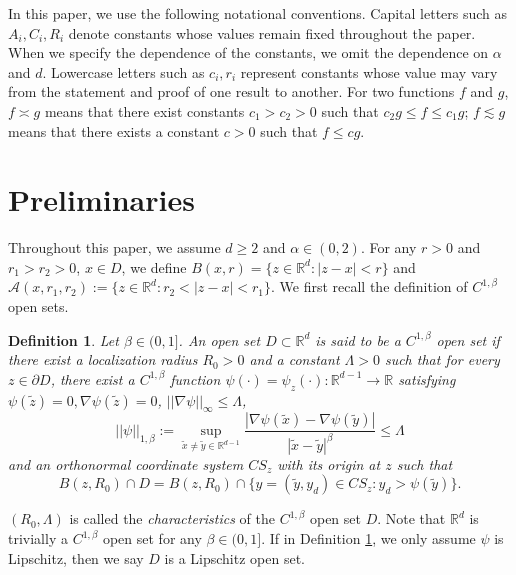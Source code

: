 \documentclass[12pt,a4paper]{amsart}
\numberwithin{equation}{section}
\theoremstyle{plain}
\newcommand{\mc}{\mathcal}
\newcommand{\mb}{\mathbb}
\newcommand{\wt}{\widetilde}
\newcommand{\R}{\mathbb{R}}
\newcommand{\1}{\mathbbm{1}}
\newtheorem{definition}[theorem]{Definition}
\begin{document}
In this paper, we use the following notational conventions. Capital letters such as $ A_i, C_i, R_i$ denote  constants whose values remain fixed throughout the paper. When we specify the dependence of the constants, we omit the dependence on $\alpha$ and $d$. 
Lowercase letters such as $ c_i, r_i$ represent constants whose value may 
vary from the statement and proof of one result to another. For two functions $f$ and $g$,  
        $f \asymp g $ means that there exist constants $c_1 > c_2 > 0$ such that
        $c_2 g \leq f \leq c_1 g$;
        $ f \lesssim g $ means that there exists a constant $ c > 0$ such that
        $f \leq c g$.
        
\section{Preliminaries}\label{sec:preliminary}

Throughout this paper, we assume $d\ge 2$ and $\alpha\in (0, 2)$. For any $r>0$ and $r_1>r_2>0$, $x\in D$, we define
$B(x,r)=\{z\in \R^d: |z-x|<r\}$ and  $\mc A(x,r_1,r_2):= \{z\in \R^d: r_2<|z-x|<r_1\}$.
We first recall the definition of $C^{1, \beta}$ open sets. 

\begin{definition}\label{d:c1beta}
Let $\beta\in (0, 1]$. An open set $D\subset\R^d$ is said to be a $C^{1,\beta}$ open set if there exist a localization radius 
$R_0>0$  and a constant
$\Lambda > 0$ such that for every $z \in \partial D$, there exist a $C^{1,\beta}$ function $\psi (\cdot)=\psi_z(\cdot): \mathbb{R}^{d-1} \to \mathbb{R}$ satisfying $\psi(\wt z)= 0, \nabla \psi(\wt z) = 0$, $||\nabla \psi||_{\infty} \le \Lambda$,  
\begin{equation} \label{C1 beta function}
||\psi||_{1,\beta}:= \sup_{\widetilde{x} \neq \widetilde{y} \in \mathbb{R}^{d-1}} \frac{|\nabla \psi(\widetilde{x})-\nabla \psi(\widetilde{y})|}{|\widetilde{x}- \widetilde{y}|^{\beta}} \le \Lambda 
\end{equation}
and an orthonormal coordinate system $CS_z$ with its origin at $z$ such that
\begin{equation} \label{local coordinate system}
B(z,R_0) \cap D = B(z,R_0) \cap \{y= (\widetilde{y},y_d) \in CS_z: y_d > \psi(\widetilde{y})\}.
\end{equation}
\end{definition}

$(R_0, \Lambda)$ is called the \textit{characteristics} of the $C^{1, \beta}$ open set $D$. Note that $\mb R^d$ is trivially a $C^{1, \beta}$ open set for any $\beta \in (0, 1]$. 
If in Definition \ref{d:c1beta}, we only assume $\psi$ is Lipschitz, then we say $D$ is a Lipschitz open set.
\end{document}
